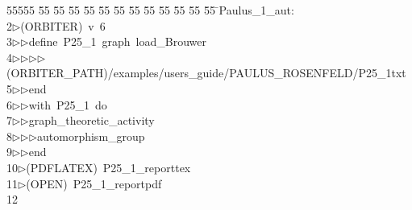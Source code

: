 %
%
\begin{tabbing}
55555 \= 55 \= 55 \= 55 \= 55 \= 55 \= 55 \= 55 \= 55 \= 55 \= 55 \= 55 \= 55 \= \>Paulus\_1\_aut:\\[0pt]
2\>$\triangleright$\>(ORBITER)\ v\ 6\ \\[0pt]
3\>$\triangleright$\>$\triangleright$\>define\ P25\_1\ graph\ load\_Brouwer\ \\[0pt]
4\>$\triangleright$\>$\triangleright$\>$\triangleright$\>$\triangleright$\>(ORBITER\_PATH)/examples/users\_guide/PAULUS\_ROSENFELD/P25\_1txt\ \\[0pt]
5\>$\triangleright$\>$\triangleright$\>end\ \\[0pt]
6\>$\triangleright$\>$\triangleright$\>with\ P25\_1\ do\ \\[0pt]
7\>$\triangleright$\>$\triangleright$\>graph\_theoretic\_activity\ \\[0pt]
8\>$\triangleright$\>$\triangleright$\>$\triangleright$\>automorphism\_group\ \\[0pt]
9\>$\triangleright$\>$\triangleright$\>end\\[0pt]
10\>$\triangleright$\>(PDFLATEX)\ P25\_1\_reporttex\\[0pt]
11\>$\triangleright$\>(OPEN)\ P25\_1\_reportpdf\\[0pt]
12\>\end{tabbing}
